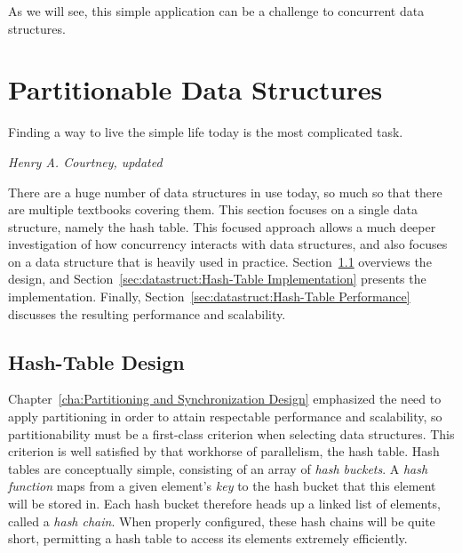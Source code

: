 As we will see, this simple application can be a challenge to concurrent
data structures.

\section{Partitionable Data Structures}
\label{sec:datastruct:Partitionable Data Structures}
%
\epigraph{Finding a way to live the simple life today is the most
	  complicated task.}
	 {\emph{Henry A. Courtney, updated}}

There are a huge number of data structures in use today, so much so
that there are multiple textbooks covering them.
This section focuses on a single data structure, namely the hash table.
This focused approach allows a much deeper investigation of how concurrency
interacts with data structures, and also focuses on a data structure
that is heavily used in practice.
Section~\ref{sec:datastruct:Hash-Table Design}
overviews the design, and
Section~\ref{sec:datastruct:Hash-Table Implementation}
presents the implementation.
Finally,
Section~\ref{sec:datastruct:Hash-Table Performance}
discusses the resulting performance and scalability.

\subsection{Hash-Table Design}
\label{sec:datastruct:Hash-Table Design}

Chapter~\ref{cha:Partitioning and Synchronization Design}
emphasized the need to apply partitioning in order to attain
respectable performance and scalability, so partitionability
must be a first-class criterion when selecting data structures.
This criterion is well satisfied by that workhorse of parallelism,
the hash table.
Hash tables are conceptually simple, consisting of an array of
\emph{hash buckets}.
A \emph{hash function} maps from a given element's \emph{key}
to the hash bucket that this element will be stored in.
Each hash bucket therefore heads up a linked list of elements,
called a \emph{hash chain}.
When properly configured, these hash chains will be quite short,
permitting a hash table to access its elements extremely efficiently.

\QuickQuizEnd

